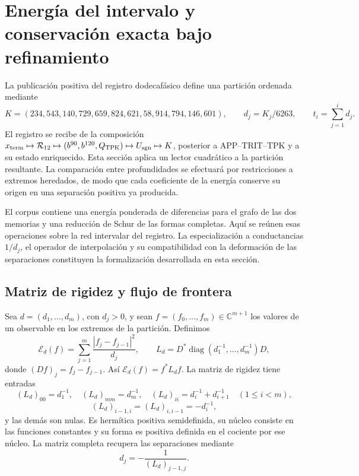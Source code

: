 \section{Energía del intervalo y conservación exacta bajo refinamiento}
\label{sec:energia-refinamiento-k}

La publicación positiva del registro dodecafásico define una partición
ordenada mediante
\[
 K=(234,543,140,729,659,824,621,58,914,794,146,601),
 \qquad d_j=K_j/6263,
 \qquad t_i=\sum_{j=1}^id_j.
\]
El registro se recibe de la composición
\(x_{\rm term}\mapsto\mathcal R_{12}\mapsto
(b^{90},b^{120},Q_{\rm TPK})\mapsto U_{\rm sgn}\mapsto K\),
posterior a APP--TRIT--TPK y a su estado enriquecido. Esta sección aplica
un lector cuadrático a la partición resultante. La comparación entre
profundidades se efectuará por restricciones a extremos heredados, de modo
que cada coeficiente de la energía conserve su origen en una separación
positiva ya producida.

El corpus contiene una energía ponderada de diferencias para el grafo de
las dos memorias y una reducción de Schur de las formas completas. Aquí se
reúnen esas operaciones sobre la red intervalar del registro. La
especialización a conductancias \(1/d_j\), el operador de interpolación
y su compatibilidad con la deformación de las separaciones constituyen
la formalización desarrollada en esta sección.

\subsection{Matriz de rigidez y flujo de frontera}

Sea \(d=(d_1,\ldots,d_m)\), con \(d_j>0\), y sean
\(f=(f_0,\ldots,f_m)\in\mathbb C^{m+1}\) los valores de un observable
en los extremos de la partición. Definimos
\begin{equation}
 \mathcal E_d(f)=\sum_{j=1}^{m}\frac{|f_j-f_{j-1}|^2}{d_j},
 \qquad L_d=D^*\operatorname{diag}(d_1^{-1},\ldots,d_m^{-1})D,
 \label{eq:energia-intervalar}
\end{equation}
donde \((Df)_j=f_j-f_{j-1}\). Así \(\mathcal E_d(f)=f^*L_df\).
La matriz de rigidez tiene entradas
\[
 (L_d)_{00}=d_1^{-1},\quad (L_d)_{mm}=d_m^{-1},\quad
 (L_d)_{ii}=d_i^{-1}+d_{i+1}^{-1}\quad(1\le i<m),
\]
\[
 (L_d)_{i-1,i}=(L_d)_{i,i-1}=-d_i^{-1},
\]
y las demás son nulas. Es hermítica positiva semidefinida, su núcleo
consiste en las funciones constantes y su forma es positiva definida
en el cociente por ese núcleo. La matriz completa recupera las
separaciones mediante
\begin{equation}
 d_j=-\frac1{(L_d)_{j-1,j}}.
 \label{eq:recuperacion-d-rigidez}
\end{equation}


